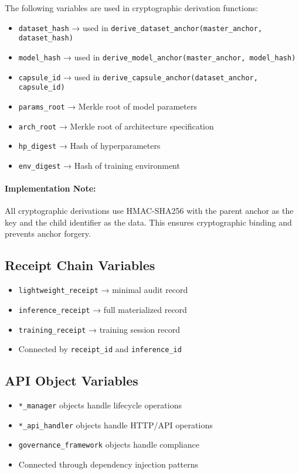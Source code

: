 \documentclass[12pt,a4paper]{article}
\begin{document}
The following variables are used in cryptographic derivation functions:

\begin{itemize}
\item \texttt{dataset\_hash} → used in \texttt{derive\_dataset\_anchor(master\_anchor,} \\
\texttt{dataset\_hash)}
\item \texttt{model\_hash} → used in \texttt{derive\_model\_anchor(master\_anchor, model\_hash)}
\item \texttt{capsule\_id} → used in \texttt{derive\_capsule\_anchor(dataset\_anchor, capsule\_id)}
\item \texttt{params\_root} → Merkle root of model parameters
\item \texttt{arch\_root} → Merkle root of architecture specification
\item \texttt{hp\_digest} → Hash of hyperparameters
\item \texttt{env\_digest} → Hash of training environment
\end{itemize}

\paragraph{Implementation Note:} All cryptographic derivations use HMAC-SHA256 with the parent anchor as the key and the child identifier as the data. This ensures cryptographic binding and prevents anchor forgery.

\subsection{Receipt Chain Variables}

\begin{itemize}
\item \texttt{lightweight\_receipt} → minimal audit record
\item \texttt{inference\_receipt} → full materialized record
\item \texttt{training\_receipt} → training session record
\item Connected by \texttt{receipt\_id} and \texttt{inference\_id}
\end{itemize}

\subsection{API Object Variables}

\begin{itemize}
\item \texttt{*\_manager} objects handle lifecycle operations
\item \texttt{*\_api\_handler} objects handle HTTP/API operations  
\item \texttt{governance\_framework} objects handle compliance
\item Connected through dependency injection patterns
\end{itemize}
\end{document}
